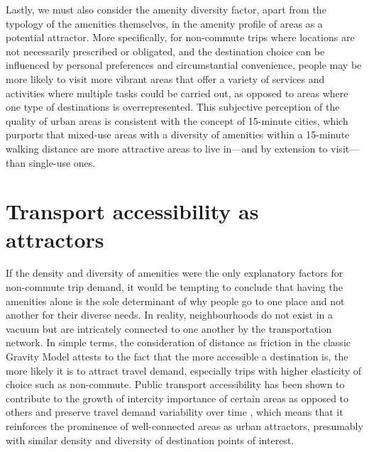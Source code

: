Lastly, we must also consider the amenity diversity factor, apart from the typology of the amenities themselves, in the amenity profile of areas as a potential attractor. More specifically, for non-commute trips where locations are not necessarily prescribed or obligated, and the destination choice can be influenced by personal preferences and circumstantial convenience, people may be more likely to visit more vibrant areas that offer a variety of services and activities where multiple tasks could be carried out, as opposed to areas where one type of destinations is overrepresented. This subjective perception of the quality of urban areas is consistent with the concept of 15-minute cities, which purports that mixed-use areas with a diversity of amenities within a 15-minute walking distance are more attractive areas to live in---and by extension to visit---than single-use ones. \citep{khavarian-garmsirGardenCity15Minute2023}

\section{Transport accessibility as attractors}

If the density and diversity of amenities were the only explanatory factors for non-commute trip demand, it would be tempting to conclude that having the amenities alone is the sole determinant of why people go to one place and not another for their diverse needs. In reality, neighbourhoods do not exist in a vacuum but are intricately connected to one another by the transportation network. In simple terms, the consideration of distance as friction in the classic Gravity Model attests to the fact that the more accessible a destination is, the more likely it is to attract travel demand, especially trips with higher elasticity of choice such as non-commute. Public transport accessibility has been shown to contribute to the growth of intercity importance of certain areas as opposed to others and preserve travel demand variability over time \citep{zhongMeasuringVariabilityMobility2015}, which means that it reinforces the prominence of well-connected areas as urban attractors, presumably with similar density and diversity of destination points of interest. 

